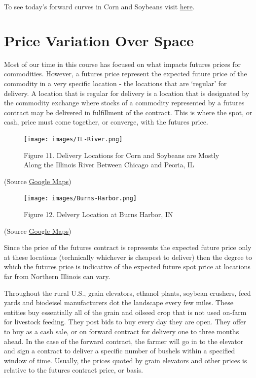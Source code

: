 \documentclass[
]{book}
\begin{document}
To see today's forward curves in Corn and Soybeans visit \href{https://mindymallory.shinyapps.io/ForwardCurves/}{here}.

\hypertarget{price-variation-over-space}{%
\section{Price Variation Over Space}\label{price-variation-over-space}}

Most of our time in this course has focused on what impacts futures prices for commodities. However, a futures price represent the expected future price of the commodity in a very specific location - the locations that are `regular' for delivery. A location that is regular for delivery is a location that is designated by the commodity exchange where stocks of a commodity represented by a futures contract may be delivered in fulfillment of the contract. This is where the spot, or cash, price must come together, or converge, with the futures price.

\begin{figure}
\centering
\texttt{[image: images/IL-River.png]}
\caption{Figure 11. Delivery Locations for Corn and Soybeans are Mostly Along the Illinois River Between Chicago and Peoria, IL}
\end{figure}

(Source \href{https://www.google.com/maps}{Google Maps})

\begin{figure}
\centering
\texttt{[image: images/Burns-Harbor.png]}
\caption{Figure 12. Delvery Location at Burns Harbor, IN}
\end{figure}

(Source \href{https://www.google.com/maps/place/Burns+Harbor,+IN/@41.740398,-87.7248706,10.5z/data=!4m5!3m4!1s0x8811bc3712ab828d:0x98301a46014d10b5!8m2!3d41.6258708!4d-87.1333676}{Google Maps})

Since the price of the futures contract is represents the expected future price only at these locations (technically whichever is cheapest to deliver) then the degree to which the futures price is indicative of the expected future spot price at locations far from Northern Illinois can vary.

Throughout the rural U.S., grain elevators, ethanol plants, soybean crushers, feed yards and biodeisel manufacturers dot the landscape every few miles. These entities buy essentially all of the grain and oilseed crop that is not used on-farm for livestock feeding. They post bids to buy every day they are open. They offer to buy as a cash sale, or on forward contract for delivery one to three months ahead. In the case of the forward contract, the farmer will go in to the elevator and sign a contract to deliver a specific number of bushels within a specified window of time. Usually, the prices quoted by grain elevators and other prices is relative to the futures contract price, or basis.
\end{document}
